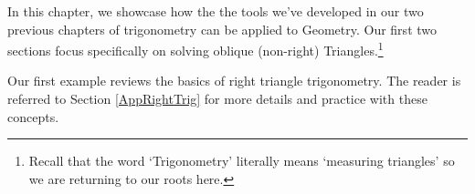 \documentclass{ximera}
\begin{document}
	\author{Stitz-Zeager}




\setcounter{footnote}{0}

\label{TheLawofSines}

In this chapter, we showcase how the the tools we've developed in our two previous chapters of trigonometry can be applied to Geometry.  Our first two sections focus specifically on solving oblique (non-right) Triangles.\footnote{Recall that the word `Trigonometry' literally means `measuring triangles' so we are returning to our roots here.} 

 

Our first example reviews the basics of right triangle trigonometry.  The reader is referred to Section \ref{AppRightTrig} for more details and practice with these concepts.
\end{document}
